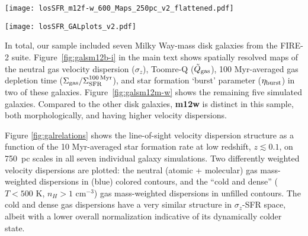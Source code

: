 \documentclass[usletter,fleqn,usenatbib]{mnras}
\begin{document}
\begin{figure*}
	\centering
	\texttt{[image: losSFR\_m12f-w\_600\_Maps\_250pc\_v2\_flattened.pdf]}
	\caption{Identical in style and plotted quantities to Fig.~\ref{fig:galsm12b-i}, but for FIRE simulations: \textbf{m12f}, \textbf{m12i}, \textbf{m12m}, \textbf{m12r}, and \textbf{m12w} at $z= 0$. Galaxy \textbf{m12w} is the least gas rich and most compact in its gas disk of the sample.  Unlike the other more extended disks in the sample, \textbf{m12w} consists entirely (in gas) of a $\sim 3$~kpc in radius dense, gravitationally unstable, nuclear gas disk.}
	\label{fig:galsm12m-w}
\end{figure*}
\begin{figure*}
	\centering
	\texttt{[image: losSFR\_GALplots\_v2.pdf]}
	\caption{Distributions of spatially resolved (750 pc pixel size) line-of-sight gas velocity dispersions ($\sigma_z$) and SFR surface densities for various gas tracers in the FIRE simulations for $z \lesssim 0.1$ (as Fig.~\ref{fig:tracers}), in individual FIRE galaxies. Distributions in gas velocity dispersions and SFRs are similar across the individual galaxies, as they are all representative of face-on MW-like disk galaxies.  \textbf{m12r} and \textbf{m12w} represent the most dynamically disturbed disk systems in the core FIRE suite, and their higher-$\sigma_z$ distributions reflect this.
	}
	\label{fig:galrelations}
\end{figure*}
In total, our sample included seven Milky Way-mass disk galaxies from the FIRE-2 suite.  Figure~\ref{fig:galsm12b-i} in the main text shows spatially resolved maps of the neutral gas velocity dispersion ($\sigma_z$), Toomre-Q ($\tilde Q_{\rm gas}$), 100 Myr-averaged gas depletion time ($\Sigma_{\rm gas}/\Sigma_{\rm SFR}^{\rm 100 \, Myr}$), and star formation `burst' parameter ($\eta_{\rm burst}$) in two of these galaxies.  Figure~\ref{fig:galsm12m-w} shows the remaining five simulated galaxies.  Compared to the other disk galaxies, \textbf{m12w} is distinct in this sample, both morphologically, and having higher velocity dispersions.

Figure \ref{fig:galrelations} shows the line-of-sight velocity dispersion structure as a function of the 10 Myr-averaged star formation rate at low redshift, $z \lesssim 0.1$, on 750~pc scales in all seven individual galaxy simulations.  Two differently weighted velocity dispersions are plotted: the neutral (atomic + molecular) gas mass-weighted dispersions in (blue) colored contours, and the ``cold and dense'' ($T < 500$ K, $n_H > 1$ cm$^{-3}$) gas mass-weighted dispersions in unfilled contours.  The cold and dense gas dispersions have a very similar structure in $\sigma_z$-SFR space, albeit with a lower overall normalization indicative of its dynamically colder state.
\end{document}

